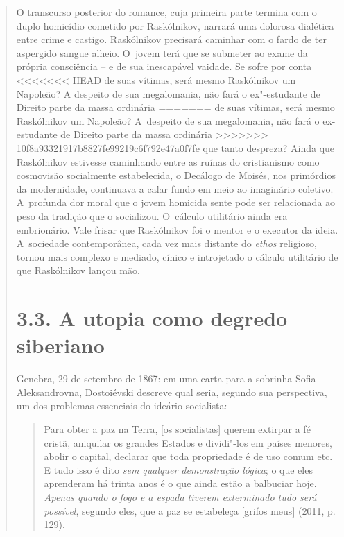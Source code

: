 {\begin{quote}
O transcurso posterior do romance, cuja primeira parte termina com o
duplo homicídio cometido por Raskólnikov, narrará uma dolorosa dialética
entre crime e castigo. Raskólnikov precisará caminhar com o fardo de ter
aspergido sangue alheio. O~jovem terá que se submeter ao exame da
própria consciência -- e de sua inescapável vaidade. Se sofre por conta
<<<<<<< HEAD
de suas vítimas, será mesmo Raskólnikov um Napoleão? A despeito de sua
megalomania, não fará o ex"-estudante de Direito parte da massa ordinária
=======
de suas vítimas, será mesmo Raskólnikov um Napoleão? A~despeito de sua
megalomania, não fará o ex-estudante de Direito parte da massa ordinária
>>>>>>> 10f8a93321917b8827fe99219c6f792e47a0f7fe
que tanto despreza? Ainda que Raskólnikov estivesse caminhando entre as
ruínas do cristianismo como cosmovisão socialmente estabelecida, o
Decálogo de Moisés, nos primórdios da modernidade, continuava a calar
fundo em meio ao imaginário coletivo. A~profunda dor moral que o jovem
homicida sente pode ser relacionada ao peso da tradição que o
socializou. O~cálculo utilitário ainda era embrionário. Vale frisar que
Raskólnikov foi o mentor e o executor da ideia. A~sociedade
contemporânea, cada vez mais distante do \emph{ethos} religioso, tornou
mais complexo e mediado, cínico e introjetado o cálculo utilitário de
que Raskólnikov lançou mão.

\section{3.3. A utopia como degredo siberiano}

Genebra, 29 de setembro de 1867: em uma carta para a sobrinha Sofia
Aleksandrovna, Dostoiévski descreve qual seria, segundo sua perspectiva,
um dos problemas essenciais do ideário socialista:

\begin{quote}
Para obter a paz na Terra, {[}os socialistas{]} querem extirpar a fé
cristã, aniquilar os grandes Estados e dividi"-los em países menores,
abolir o capital, declarar que toda propriedade é de uso comum etc. E
tudo isso é dito \emph{sem qualquer demonstração lógica}; o que eles
aprenderam há trinta anos é o que ainda estão a balbuciar hoje.
\emph{Apenas quando o fogo e a espada tiverem exterminado tudo será
possível}, segundo eles, que a paz se estabeleça {[}grifos meus{]}
(2011, p. 129).
\end{quote}


\end{quote}}
